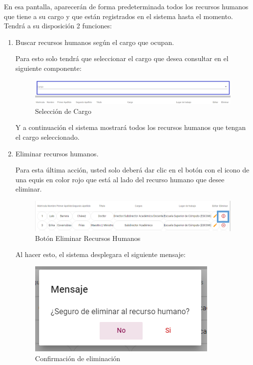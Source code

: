         En esa pantalla, aparecerán de forma predeterminada todos los recursos humanos que tiene a su cargo y que están registrados en el sistema hasta el momento. Tendrá a su disposición 2 funciones:
        \newpage
        \begin{enumerate}
        
            \item   Buscar recursos humanos según el cargo que ocupan.
        
                Para esto solo tendrá que seleccionar el cargo que desea consultar en el siguiente componente:
            
                \begin{figure}[!hbtp]
                    \centering
                    \hypertarget{cargo1}{\includegraphics[width=0.7\linewidth]{images/SP1/BtnCargo1}}
                    \caption{Selección de Cargo}
                    \label{cargo1}
                \end{figure}
            
                 Y a continuación el sistema mostrará todos los recursos humanos que tengan el cargo seleccionado.

                    \item Eliminar recursos humanos.
            
                Para esta última acción, usted solo deberá dar clic en el botón con el icono de una equis en color rojo que está al lado del recurso humano que desee  eliminar. 
            
                \begin{figure}[!hbtp]
                    \centering
                    \hypertarget{eliminar}{\includegraphics[width=0.7\linewidth]{images/SP1/BtnEliminar}}
                    \caption{Botón Eliminar Recursos Humanos}
                    \label{eliminar}
                \end{figure}
            
                Al hacer esto, el sistema desplegara el siguiente mensaje:
                
               \begin{figure}[!hbtp]
                    \centering
                    \includegraphics[width=0.4\linewidth]{images/SP1/MSG22}
                \caption{Confirmación de eliminación}
                \label{confirmarE}
                

\end{figure}
\end{enumerate}
